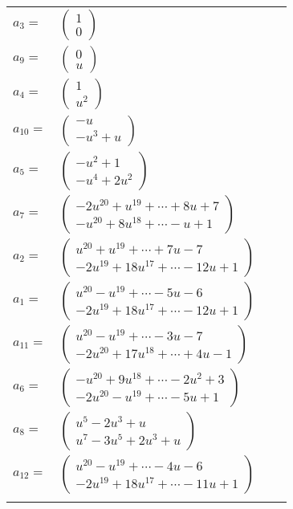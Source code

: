 \documentclass[1p]{elsarticle_modified}
\theoremstyle{definition}
\begin{document}
\begin{tabular}{m{7pt} m{180pt} m{7pt} m{180pt} }
\flushright $a_{3}=$&$\begin{pmatrix}1\\0\end{pmatrix}$ \\
\flushright $a_{9}=$&$\begin{pmatrix}0\\u\end{pmatrix}$ \\
\flushright $a_{4}=$&$\begin{pmatrix}1\\u^2\end{pmatrix}$ \\
\flushright $a_{10}=$&$\begin{pmatrix}- u\\- u^3+u\end{pmatrix}$ \\
\flushright $a_{5}=$&$\begin{pmatrix}- u^2+1\\- u^4+2 u^2\end{pmatrix}$ \\
\flushright $a_{7}=$&$\begin{pmatrix}-2 u^{20}+u^{19}+\cdots+8 u+7\\- u^{20}+8 u^{18}+\cdots- u+1\end{pmatrix}$ \\
\flushright $a_{2}=$&$\begin{pmatrix}u^{20}+u^{19}+\cdots+7 u-7\\-2 u^{19}+18 u^{17}+\cdots-12 u+1\end{pmatrix}$ \\
\flushright $a_{1}=$&$\begin{pmatrix}u^{20}- u^{19}+\cdots-5 u-6\\-2 u^{19}+18 u^{17}+\cdots-12 u+1\end{pmatrix}$ \\
\flushright $a_{11}=$&$\begin{pmatrix}u^{20}- u^{19}+\cdots-3 u-7\\-2 u^{20}+17 u^{18}+\cdots+4 u-1\end{pmatrix}$ \\
\flushright $a_{6}=$&$\begin{pmatrix}- u^{20}+9 u^{18}+\cdots-2 u^2+3\\-2 u^{20}- u^{19}+\cdots-5 u+1\end{pmatrix}$ \\
\flushright $a_{8}=$&$\begin{pmatrix}u^5-2 u^3+u\\u^7-3 u^5+2 u^3+u\end{pmatrix}$ \\
\flushright $a_{12}=$&$\begin{pmatrix}u^{20}- u^{19}+\cdots-4 u-6\\-2 u^{19}+18 u^{17}+\cdots-11 u+1\end{pmatrix}$\\&\end{tabular}
\end{document}
